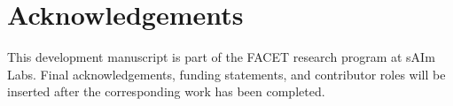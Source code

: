 \section*{Acknowledgements}
This development manuscript is part of the FACET research program at sAIm Labs. Final acknowledgements, funding statements, and contributor roles will be inserted after the corresponding work has been completed.
